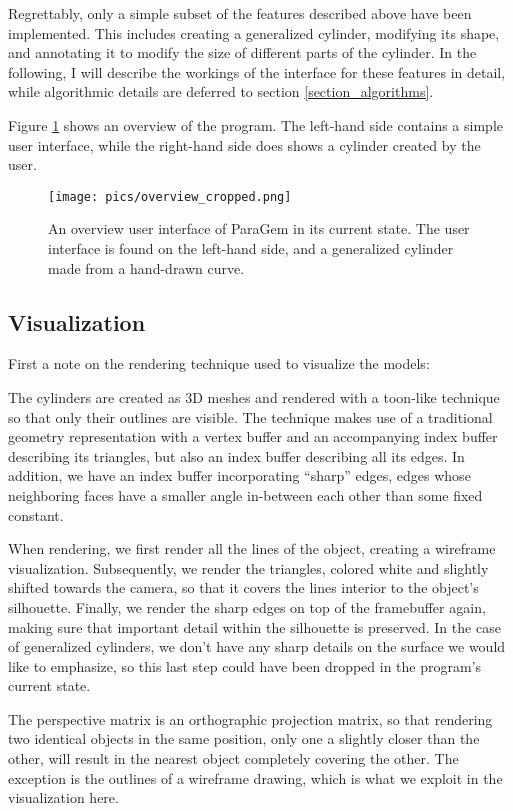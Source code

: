 \documentclass[english]{article}
\begin{document}
Regrettably, only a simple subset of the features described above have been implemented. This includes creating a generalized cylinder, modifying its shape, and annotating it to modify the size of different parts of the cylinder. In the following, I will describe the workings of the interface for these features in detail, while algorithmic details are deferred to section \ref{section_algorithms}.

Figure \ref{fig_overview} shows an overview of the program. The left-hand side contains a simple user interface, while the right-hand side does shows a cylinder created by the user.

\begin{figure}
  \centering
  \texttt{[image: pics/overview\_cropped.png]}
  \caption{An overview user interface of ParaGem in its current state. The user interface is found on the left-hand side, and a generalized cylinder made from a hand-drawn curve. }
  \label{fig_overview}
\end{figure}

\subsection{Visualization}

First a note on the rendering technique used to visualize the models:

The cylinders are created as 3D meshes and rendered with a toon-like technique so that only their outlines are visible. The technique makes use of a traditional geometry representation with a vertex buffer and an accompanying index buffer describing its triangles, but also an index buffer describing all its edges. In addition, we have an index buffer incorporating ``sharp'' edges, edges whose neighboring faces have a smaller angle in-between each other than some fixed constant.

When rendering, we first render all the lines of the object, creating a wireframe visualization. Subsequently, we render the triangles, colored white and slightly shifted towards the camera, so that it covers the lines interior to the object's silhouette. Finally, we render the sharp edges on top of the framebuffer again, making sure that important detail within the silhouette is preserved. In the case of generalized cylinders, we don't have any sharp details on the surface we would like to emphasize, so this last step could have been dropped in the program's current state.

The perspective matrix is an orthographic projection matrix, so that rendering two identical objects in the same position, only one a slightly closer than the other, will result in the nearest object completely covering the other. The exception is the outlines of a wireframe drawing, which is what we exploit in the visualization here. 
\end{document}
